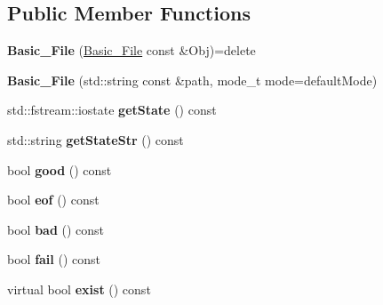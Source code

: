 \subsection*{Public Member Functions}
\begin{DoxyCompactItemize}
\item 
\hypertarget{classstb_1_1Basic__File_a2718f72b59bcc177984115209d1c4141}{{\bfseries Basic\+\_\+\+File} (\hyperlink{classstb_1_1Basic__File}{Basic\+\_\+\+File} const \&Obj)=delete}\label{classstb_1_1Basic__File_a2718f72b59bcc177984115209d1c4141}

\item 
\hypertarget{classstb_1_1Basic__File_aa217e5e4ddbd3d09114bc955900bd014}{{\bfseries Basic\+\_\+\+File} (std\+::string const \&path, mode\+\_\+t mode=default\+Mode)}\label{classstb_1_1Basic__File_aa217e5e4ddbd3d09114bc955900bd014}

\item 
\hypertarget{classstb_1_1Basic__File_aa669c3fc8e2e841978b0bfae00f8c390}{std\+::fstream\+::iostate {\bfseries get\+State} () const }\label{classstb_1_1Basic__File_aa669c3fc8e2e841978b0bfae00f8c390}

\item 
\hypertarget{classstb_1_1Basic__File_a8d8b2184231df49a628f74e5517861aa}{std\+::string {\bfseries get\+State\+Str} () const }\label{classstb_1_1Basic__File_a8d8b2184231df49a628f74e5517861aa}

\item 
\hypertarget{classstb_1_1Basic__File_ac88a82151019d3cfe066643a1149554b}{bool {\bfseries good} () const }\label{classstb_1_1Basic__File_ac88a82151019d3cfe066643a1149554b}

\item 
\hypertarget{classstb_1_1Basic__File_a8534a1e2c4f162815b5aa8c5bbcfb704}{bool {\bfseries eof} () const }\label{classstb_1_1Basic__File_a8534a1e2c4f162815b5aa8c5bbcfb704}

\item 
\hypertarget{classstb_1_1Basic__File_accc6d5c7074dcd8d3632ae3bc83d1148}{bool {\bfseries bad} () const }\label{classstb_1_1Basic__File_accc6d5c7074dcd8d3632ae3bc83d1148}

\item 
\hypertarget{classstb_1_1Basic__File_a3e0be6803da090e73e37c544f3b47b42}{bool {\bfseries fail} () const }\label{classstb_1_1Basic__File_a3e0be6803da090e73e37c544f3b47b42}

\item 
\hypertarget{classstb_1_1Basic__File_a765b565cef3031fe5700f3acaa1e2298}{virtual bool {\bfseries exist} () const }\label{classstb_1_1Basic__File_a765b565cef3031fe5700f3acaa1e2298}


\end{DoxyCompactItemize}
